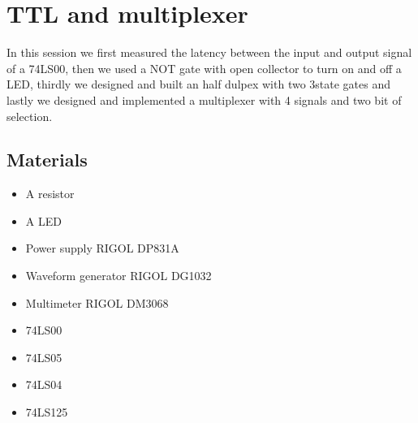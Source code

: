 \chapter{TTL and multiplexer}
In this session we first measured the latency between the input and output signal of a 74LS00, then we used a NOT gate with open collector to turn on and off a LED, thirdly we designed and built an half dulpex with two 3state gates and lastly we designed and implemented a multiplexer with 4 signals and two bit of selection.

\section{Materials}
\begin{itemize}
\item A resistor
\item A LED
\item Power supply RIGOL DP831A
\item Waveform generator RIGOL DG1032
\item Multimeter RIGOL DM3068
\item 74LS00
\item 74LS05
\item 74LS04
\item 74LS125
\end{itemize}

